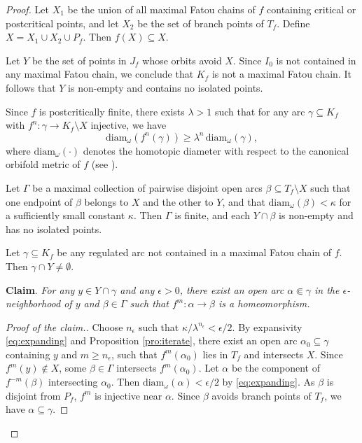 \documentclass[a4paper,reqno,times, 11pt]{amsart}
\theoremstyle{remark}
\theoremstyle{plain}
\numberwithin{equation}{section}
\begin{document}
	\begin{proof}
		Let $X_1$ be the union of all maximal Fatou chains of $f$ containing critical or postcritical points, and let $X_2$ be the set of branch points of $T_f$. Define $X = X_1 \cup X_2 \cup P_f$. Then $f(X) \subseteq X$.
		
		Let $Y$ be the set of points in $J_f$ whose orbits avoid $X$. Since $I_0$ is not contained in any maximal Fatou chain, we conclude that $K_f$ is not a maximal Fatou chain. It follows that $Y$ is non-empty and contains no isolated points.
		
		Since $f$ is postcritically finite, there exists $\lambda > 1$ such that for any arc $\gamma \subseteq K_f$ with $f^n: \gamma \to K_f \setminus X$ injective, we have
		\begin{equation}\label{eq:expanding}
			\mathrm{diam}_\omega(f^n(\gamma)) \geq \lambda^n \, \mathrm{diam}_\omega(\gamma),
		\end{equation}
		where $\mathrm{diam}_\omega(\cdot)$ denotes the homotopic diameter with respect to the canonical orbifold metric of $f$ (see \cite[Appendix A]{CGZ}).
		
		Let $\Gamma$ be a maximal collection of pairwise disjoint open arcs $\beta \subseteq T_f \setminus X$
such that one endpoint of $\beta$ belongs to $X$ and the other to $Y$, and that $\mathrm{diam}_\omega(\beta) < \kappa$ for a sufficiently small constant $\kappa$.
		Then $\Gamma$ is finite, and each $Y \cap \beta$ is non-empty and has no isolated points.
		
		Let $\gamma \subseteq K_f$ be any regulated arc not contained in a maximal Fatou chain of $f$. Then $\gamma \cap Y \neq \emptyset$.\vspace{5pt}
		
		
		{\bf Claim}.   \emph{For any $y \in Y \cap \gamma$ and any $\epsilon > 0$, there exist an open arc $\alpha \Subset \gamma$ in the $\epsilon$-neighborhood of $y$ and $\beta \in \Gamma$ such that $f^m: \alpha \to \beta$ is a homeomorphism.}
		
		
		\begin{proof}[Proof of the claim.]
			Choose $n_\epsilon$ such that $\kappa / \lambda^{n_\epsilon} < \epsilon/2$.
			By expansivity \eqref{eq:expanding} and Proposition \ref{pro:iterate}, there exist an open arc $\alpha_0 \subseteq \gamma$ containing $y$ and $m \geq n_\epsilon$, such that $f^m(\alpha_0)$ lies in $T_f$ and intersects $X$. Since $f^m(y) \notin X$, some $\beta \in \Gamma$ intersects $f^m(\alpha_0)$. Let $\alpha$ be the component of $f^{-m}(\beta)$ intersecting $\alpha_0$. Then $\mathrm{diam}_\omega(\alpha) < \epsilon/2$ by \eqref{eq:expanding}. As $\beta$ is disjoint from $P_f$, $f^m$ is injective near $\alpha$. Since $\beta$ avoids branch points of $T_f$, we have $\alpha \subseteq \gamma$.
		\end{proof}
		

\end{proof}
\end{document}

